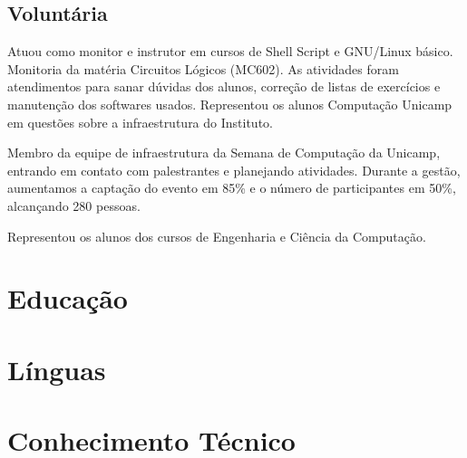 \documentclass[10pt, a4paper, roman]{moderncv} %
\begin{document}
\subsection{Voluntária}
{
    Atuou como monitor e instrutor em cursos de Shell Script e GNU/Linux básico.
}
{
    Monitoria da matéria Circuitos Lógicos (MC602). As atividades foram atendimentos para sanar dúvidas 
    dos alunos, correção de listas de exercícios e manutenção dos softwares usados.
}
{
Representou os alunos Computação Unicamp em questões sobre a 
    infraestrutura do Instituto.
}

{
Membro da equipe de infraestrutura da Semana de Computação da Unicamp, entrando em contato com palestrantes e planejando atividades.
Durante a gestão, aumentamos a captação do evento em 85\% e o número de participantes em 50\%, alcançando 280 pessoas.
}

{
Representou os alunos dos cursos de Engenharia e Ciência da Computação.
}

\section{Educação}



\section{Línguas}

\section{Conhecimento Técnico}

\end{document}
